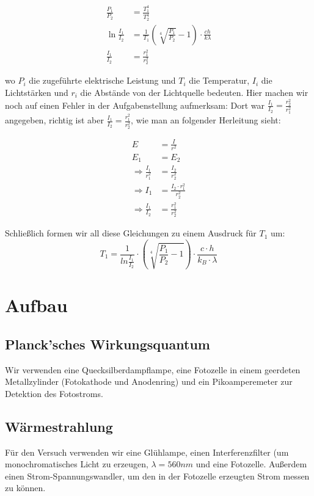 \documentclass[12pt,a4paper,twopage]{article}
\begin{document}
\begin{align}
\label{waermetheorie}
\frac{P_1}{P_2}& = \frac{T_1^4}{T_2^4} \\
\ln \frac{I_1}{I_2} &= \frac{1}{T_1} \left(\sqrt[4]{\frac{P_1}{P_2}}-1\right) \cdot \frac{ch}{k\lambda} \\
\frac{I_1}{I_2} &= \frac{r_1^2}{r_2^2}
\label{waermeende}
\end{align}

wo $P_i$ die zugeführte elektrische Leistung und $T_i$ die Temperatur, 
$I_i$ die Lichtstärken und $r_i$ die Abstände von der Lichtquelle bedeuten.
Hier machen wir noch auf einen Fehler in der Aufgabenstellung aufmerksam: Dort war $\frac{I_1}{I_2} = \frac{r_2^2}{r_1^2}$ angegeben, richtig ist aber $\frac{I_1}{I_2} = \frac{r_1^2}{r_2^2}$, wie man an folgender Herleitung sieht:


\begin{align*}
E&=\frac{I}{r^2}\\
E_1&= E_ 2 \\
\Rightarrow \frac{I_1}{r_1^2}&= \frac{I_2}{r_2^2} \\
\Rightarrow I_1&= \frac{I_2 \cdot \textbf{$r_1^2$}}{r_2^2} \\
\Rightarrow \frac{I_1}{I_2}&= \frac{r_1^2}{r_2^2}
\end{align*}

Schließlich formen wir all diese Gleichungen zu einem Ausdruck für $T_1$ um:
\begin{equation}
T_1=\frac{1}{ln \frac{I_1}{I_2}}\cdot \left( \sqrt[4]{\frac{P_1}{P_2}-1} \right) \cdot \frac{c\cdot h}{k_B\cdot \lambda}
\end{equation} 
\section{Aufbau}
\subsection{Planck'sches Wirkungsquantum}
Wir verwenden eine Quecksilberdampflampe, eine Fotozelle in einem geerdeten Metallzylinder (Fotokathode und Anodenring) und ein Pikoamperemeter zur Detektion des Fotostroms.

\subsection{Wärmestrahlung}
Für den Versuch verwenden wir eine Glühlampe, einen Interferenzfilter (um monochromatisches Licht zu erzeugen, $\lambda=560\si{nm}$ und eine Fotozelle. Außerdem einen Strom-Spannungswandler, um den in der Fotozelle erzeugten Strom messen zu können.
\end{document}
